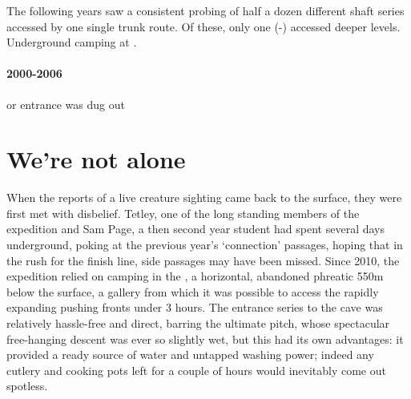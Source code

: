 The following years saw a consistent probing of half a dozen different shaft series accessed by one single trunk route. Of these, only one (-) accessed deeper levels. Underground camping at .

\paragraph{2000-2006}  or  entrance was dug out



\section{We’re not alone}

When the reports of a live creature sighting came back to the surface, they were first met with disbelief. Tetley, one of the long standing members of the expedition and Sam Page, a then second year student had spent several days underground, poking at the previous year’s ‘connection’ passages, hoping that in the rush for the finish line, side passages may have been missed. Since 2010, the expedition relied on camping in the , a horizontal, abandoned phreatic 550m below the surface, a gallery from which it was possible to access the rapidly expanding pushing fronts under 3 hours. The entrance series to the cave was relatively hassle-free and direct, barring the ultimate pitch, whose spectacular free-hanging descent was ever so slightly wet, but this had its own advantages: it provided a ready source of water and untapped washing power; indeed any cutlery and cooking pots left for a couple of hours would inevitably come out spotless.



